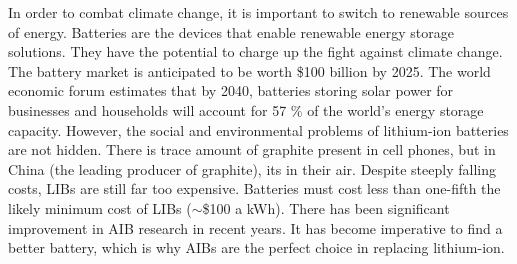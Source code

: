 In order to combat climate change, it is important to switch to renewable sources of energy. Batteries are the devices that enable renewable energy storage solutions. They have the potential to charge up the fight against climate change. The battery market is anticipated to be worth \$100 billion by 2025. The world economic forum estimates that by 2040, batteries storing solar power for businesses and households will account for 57 \% of the world’s energy storage capacity. However, the social and environmental problems of lithium-ion batteries are not hidden. There is trace amount of graphite present in cell phones, but in China (the leading producer of graphite), its in their air. Despite steeply falling costs, LIBs are still far too expensive. Batteries must cost less than one-fifth the likely minimum cost of LIBs ($\sim$\$100 a kWh). There has been significant improvement in AIB research in recent years. It has become imperative to find a better battery, which is why AIBs are the perfect choice in replacing lithium-ion.




